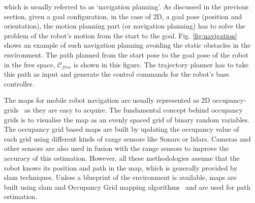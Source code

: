 which is usually referred to as `navigation planning'. As discussed in the previous section, given a goal configuration, in the case of 2D, a goal pose (position and orientation), the motion planning part (or navigation planning) has to solve the problem of the robot's motion from the start to the goal. Fig. \ref{fig:navigation} shows an example of such navigation planning avoiding the static obstacles in the environment. The path planned from the start pose to the goal pose of the robot in the free space, $\mathcal{C}_{free}$ is shown in this figure. The trajectory planner has to take this path as input and generate the control commands for the robot's base controller.

The maps for mobile robot navigation are usually represented as 2D occupancy-grids~\cite{thrun2006probalistic} as they are easy to acquire. The fundamental concept behind occupancy grids is to visualise the map as an evenly spaced grid of binary random variables. The occupancy grid based maps are built by updating the occupancy value of each grid using different kinds of range sensors like Sonars or \acrshort{lidar}s. Cameras and other sensors are also used in fusion with the range sensors to improve the accuracy of this estimation. However, all these methodologies assume that the robot knows its position and path in the map, which is generally provided by \acrshort{slam} techniques. Unless a blueprint of the environment is available, maps are built using \acrshort{slam} and Occupancy Grid mapping algorithms~\cite{thrun2006probalistic} and are used for path estimation. 

